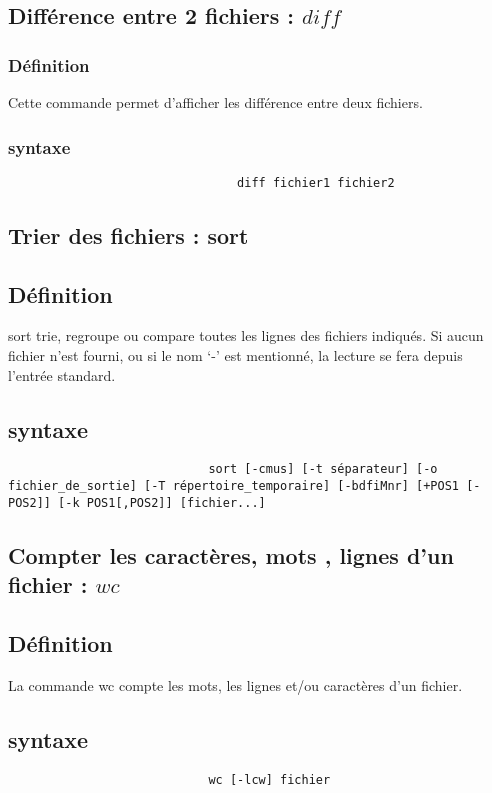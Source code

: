 					\subsection{Différence entre 2 fichiers : $diff$}			
						\subsubsection{Définition}			
							Cette commande permet d'afficher les différence entre deux fichiers.
						\subsubsection{syntaxe}					
							\begin{verbatim}
						 		diff fichier1 fichier2
							\end{verbatim}	
			\subsection{Trier des fichiers : sort}
					\subsection{Définition}		
						sort trie, regroupe ou compare toutes les lignes des fichiers indiqués. Si aucun fichier n'est fourni, ou si le nom `-' est mentionné, la lecture se fera depuis l'entrée standard.
					\subsection{syntaxe}					
						\begin{verbatim}
							sort [-cmus] [-t séparateur] [-o fichier_de_sortie] [-T répertoire_temporaire] [-bdfiMnr] [+POS1 [-POS2]] [-k POS1[,POS2]] [fichier...]  
						\end{verbatim}					
			\subsection{Compter les caractères, mots , lignes d'un fichier : $wc$}
					\subsection{Définition}	
						La commande wc compte les mots, les lignes et/ou caractères d'un fichier.
					\subsection{syntaxe}					
						\begin{verbatim}
							wc [-lcw] fichier
						\end{verbatim}					
